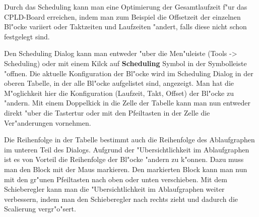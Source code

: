 \documentclass[a4paper,titlepage,12pt,ngerman]{scrbook}
\begin{document}
Durch das Scheduling kann man eine Optimierung der Gesamtlaufzeit f"ur das CPLD-Board erreichen, indem man zum Beispiel die Offsetzeit der einzelnen Bl"ocke variiert oder Taktzeiten und Laufzeiten "andert, falls diese nicht schon festgelegt sind.\par
Den Scheduling Dialog kann man entweder "uber die Men"uleiste (Tools -> Scheduling) oder mit einem Kilck auf {\bf Scheduling} Symbol in der Symbolleiste "offnen.
Die aktuelle Konfiguration der Bl"ocke wird im Scheduling Dialog in der oberen Tabelle, in der alle Bl"ocke aufgelistet sind, angezeigt. Man hat die M"oglichkeit hier die Konfiguration (Laufzeit, Takt, Offset) der Bl"ocke zu "andern. Mit einem Doppelkick in die Zelle der Tabelle kann man nun entweder direkt "uber die Tastertur oder mit den Pfeiltasten in der Zelle die Ver"anderungen vornehmen.\par
Die Reihenfolge in der Tabelle bestimmt auch die Reihenfolge des Ablaufgraphen im unteren Teil des Dialogs. Aufgrund der "Ubersichtlichkeit im Ablaufgraphen ist es von Vorteil die Reihenfolge der Bl"ocke "andern zu k"onnen. Dazu muss man den Block mit der Maus markieren. Den markierten Block kann man nun mit den gr"unen Pfeiltasten nach oben oder unten verschieben. Mit dem Schieberegler kann man die "Ubersichtlichkeit im Ablaufgraphen weiter verbessern, indem man den Schieberegler nach rechts zieht und dadurch die Scalierung vergr"o"sert.\par
\end{document}
